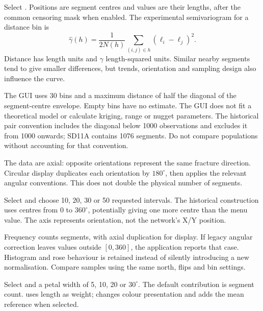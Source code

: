 Select . Positions are segment centres and values are their lengths, after the common censoring mask when enabled. The experimental semivariogram for a distance bin is
\begin{equation}
\widehat\gamma(h)=\frac{1}{2N(h)}\sum_{(i,j)\in h}(\ell_i-\ell_j)^2.
\end{equation}
Distance has length units and \(\gamma\) length-squared units. Similar nearby segments tend to give smaller differences, but trends, orientation and sampling design also influence the curve.

The GUI uses 30 bins and a maximum distance of half the diagonal of the segment-centre envelope. Empty bins have no estimate. The GUI does not fit a theoretical model or calculate kriging, range or nugget parameters. The historical pair convention includes the diagonal below 1000 observations and excludes it from 1000 onwards; SD11A contains 1076 segments. Do not compare populations without accounting for that convention.

\label{sec:angles}
The data are axial: opposite orientations represent the same fracture direction. Circular display duplicates each orientation by \(180^\circ\), then applies the relevant angular conventions. This does not double the physical number of segments.

Select  and choose 10, 20, 30 or 50 requested intervals. The historical construction uses centres from 0 to \(360^\circ\), potentially giving one more centre than the menu value. The axis represents orientation, not the network's X/Y position.

Frequency counts segments, with axial duplication for display. If legacy angular correction leaves values outside \([0,360]\), the application reports that case. Histogram and rose behaviour is retained instead of silently introducing a new normalisation. Compare samples using the same north, flips and bin settings.

Select  and a petal width of 5, 10, 20 or \(30^\circ\). The default contribution is segment count.  uses length as weight;  changes colour presentation and  adds the mean reference when selected.

